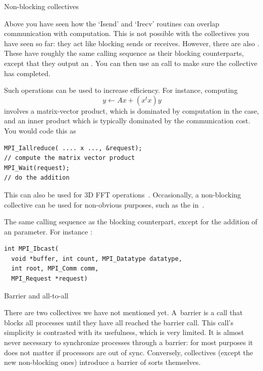  {Non-blocking collectives}
\label{sec:mpi3collect}

Above you have seen how the `Isend' and `Irecv' routines can overlap communication
with computation. This is not possible with the collectives you have seen so far:
they act like blocking sends or receives.
However, there are also .
These have roughly the same calling sequence as their blocking counterparts,
except that they output an . You
can then use an  call to make sure the collective
has completed.

Such operations can be used to increase efficiency.
For instance, computing
\[ y \leftarrow Ax + (x^tx)y \]
involves a matrix-vector product, which is dominated by computation
in the  case, and an inner product which is 
typically dominated by the communication cost. You would code this as
\begin{verbatim}
MPI_Iallreduce( .... x ..., &request);
// compute the matrix vector product
MPI_Wait(request);
// do the addition
\end{verbatim}

This can also be used for 3D FFT operations~\cite{Hoefler:case-for-nbc}.
Occasionally, a non-blocking collective can be used for non-obvious purposes,
such as the  in~\cite{Hoefler:2010:SCP}.

The same calling sequence as the blocking counterpart, except for the addition
of an  parameter. For instance 
:
\begin{verbatim}
int MPI_Ibcast(
  void *buffer, int count, MPI_Datatype datatype,
  int root, MPI_Comm comm, 
  MPI_Request *request)
\end{verbatim}



 {Barrier and all-to-all}
\label{sec:barrier}
\label{sec:alltoall}

There are two collectives we have not mentioned yet. A~barrier is a
call that blocks all processes until they have all reached the barrier
call. This call's simplicity is contrasted with its usefulness, which
is very limited. It is almost never necessary to synchronize processes
through a barrier: for most purposes it does not matter if processors
are out of sync. Conversely, collectives (except the new non-blocking
ones) introduce a barrier of sorts themselves.

